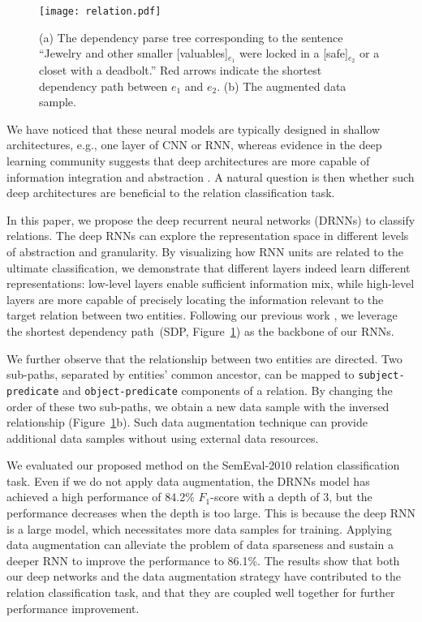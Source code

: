 \documentclass[11pt]{article}
\begin{document}
\begin{figure}[!t]
\centering
\texttt{[image: relation.pdf]}
\caption{(a) The dependency parse tree corresponding to the sentence ``Jewelry and other smaller [valuables]$_{e_1}$ were locked in a [safe]$_{e_2}$ or a closet with a deadbolt.''
Red arrows indicate the shortest dependency path between $e_1$ and $e_2$. (b) The augmented data sample.}\label{fig:example}
\end{figure}

We have noticed that these neural models are typically designed in shallow architectures, e.g., one layer of CNN or RNN, whereas evidence in the deep learning community suggests that deep architectures are more capable of information integration and abstraction \cite{SpeechDRNN,TrainDRNN,OpinionDRNN}. A natural question is then whether such deep architectures are beneficial to the relation classification task.

In this paper, we propose the deep recurrent neural networks (DRNNs) to classify relations. The deep RNNs can explore the representation space in different levels of abstraction and granularity. By visualizing how RNN units are related to the ultimate classification, we demonstrate that different layers indeed learn different representations: low-level layers enable sufficient information mix, while high-level layers are more capable of precisely locating the information relevant to the target relation between two entities. Following our previous work \cite{SDP-LSTM}, we leverage the shortest dependency path~(SDP, Figure~\ref{fig:example}) as the backbone of our RNNs.






We further observe that the relationship between two entities are directed. Two sub-paths, separated by entities' common ancestor, can be mapped to {\tt subject-predicate} and {\tt object-predicate} components of a relation. By changing the order of these two sub-paths, we obtain a new data sample with the inversed relationship (Figure~\ref{fig:example}b). Such data augmentation technique can provide additional data samples without using external data resources.



We evaluated our proposed method on the SemEval-2010 relation classification task. Even if we do not apply data augmentation, the DRNNs model has achieved a high performance of 84.2\% $F_1$-score with a depth of 3, but the performance decreases when the depth is too large. This is because the deep RNN is a large model, which necessitates more data samples for training. Applying data augmentation can alleviate the problem of data sparseness and sustain a deeper RNN to improve the performance to 86.1\%.
The results show that both our deep networks and the data augmentation strategy have contributed to the relation classification task, and that they are coupled well together for further performance improvement.
\end{document}
